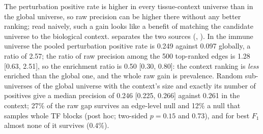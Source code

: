 \documentclass[11pt,a4paper]{article}
\begin{document}
The perturbation positive rate is higher in every tissue-context universe than in the global universe, so raw precision can be higher there without any better ranking; read naively, such a gain looks like a benefit of matching the candidate universe to the biological context.
 separates the two sources (, ).
In the immune universe the pooled perturbation positive rate is 0.249 against 0.097 globally, a ratio of 2.57; the ratio of raw precision among the 500 top-ranked edges is 1.28 [0.63, 2.51], so the enrichment ratio is 0.50 [0.30, 0.80]: the context ranking is \emph{less} enriched than the global one, and the whole raw gain is prevalence.
Random sub-universes of the global universe with the context's size and exactly its number of positives give a median precision of 0.246 [0.225, 0.266] against 0.261 in the context; 27\% of the raw gap survives an edge-level null and 12\% a null that samples whole TF blocks (post hoc; two-sided $p=0.15$ and 0.73), and for best $F_1$ almost none of it survives (0.4\%).
\end{document}
